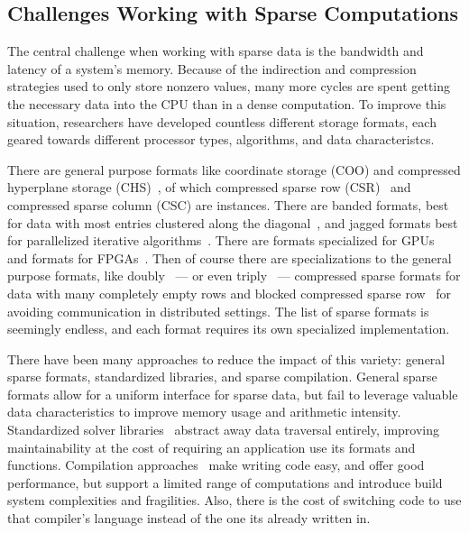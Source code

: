\subsection{Challenges Working with Sparse Computations}

The central challenge when working with sparse data is the bandwidth and latency of a system's memory.
Because of the indirection and compression strategies used to only store nonzero values, many more cycles are spent getting the necessary data into the CPU than in a dense computation.
To improve this situation, researchers have developed countless different storage formats, each geared towards different processor types, algorithms, and data characteristcs.

There are general purpose formats like coordinate storage (COO) and compressed hyperplane storage (CHS)~\cite{ahmed2000compiling}, of which compressed sparse row (CSR)~\cite{gustavson1972some} and compressed sparse column (CSC) are instances.
There are banded formats, best for data with most entries clustered along the diagonal~\cite{jennings1966compact}, and jagged formats best for parallelized iterative algorithms~\cite{saad1989krylov,montagne2004optimal}.
There are formats specialized for GPUs~\cite{fan2004gpu,bell2009implementing,bell2008efficient,monakov2010automatically} and formats for FPGAs~\cite{sun2007sparse,kestur2012towards,fowers2014high}.
Then of course there are specializations to the general purpose formats, like doubly~\cite{buluc2008representation} --- or even triply~\cite{mofrad2019efficient} --- compressed sparse formats for data with many completely empty rows and blocked compressed sparse row~\cite{vuduc2005fast} for avoiding communication in distributed settings.
The list of sparse formats is seemingly endless, and each format requires its own specialized implementation.

There have been many approaches to reduce the impact of this variety: general sparse formats, standardized libraries, and sparse compilation.
General sparse formats allow for a uniform interface for sparse data, but fail to leverage valuable data characteristics to improve memory usage and arithmetic intensity.
Standardized solver libraries~\cite{eisenstat1977yale,eisenstat1977yale2,eisenstat1984new,kincaid1982algorithm,chu1980user,george1984new,marsten1981design,saad1990sparskit,falgout2006design} abstract away data traversal entirely, improving maintainability at the cost of requiring an application use its formats and functions.
Compilation approaches~\cite{ahmed2000compiling,ahmed2000framework,bik1993automatic,bik1996automatic,bik2022compiler} make writing code easy, and offer good performance, but support a limited range of computations and introduce build system complexities and fragilities.
Also, there is the cost of switching code to use that compiler's language instead of the one its already written in.


